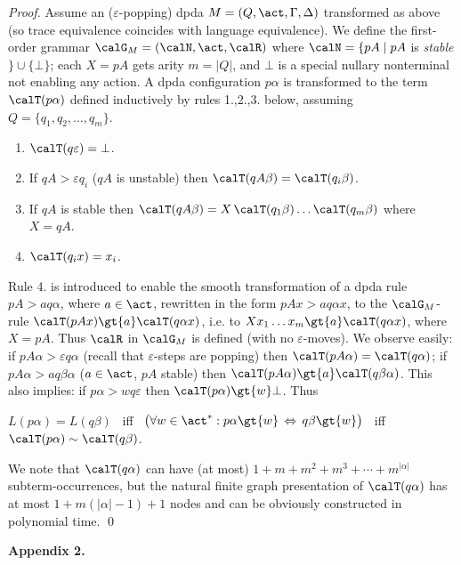 \documentclass[12pt]{article}
\begin{document}
\begin{proof}
Assume an ($\varepsilon$-popping) dpda $M=(Q,\act,\Gamma,\Delta)$
transformed as above
(so trace equivalence coincides with language equivalence).
We define  the first-order grammar $\calG_M=(\calN,\act,\calR)$ where 
$\calN=\{pA\mid pA $ is \emph{stable}$\}\cup\{\bot\}$; 
each $X=pA$ gets arity $m=|Q|$, and 
$\bot$ is a special nullary nonterminal not
enabling any action.
A dpda configuration $p \alpha$ 
is transformed to the term 
$\calT(p \alpha)$ defined inductively by rules 1.,2.,3. below,
assuming $Q=\{q_1,q_2,\dots,q_m\}$. 
\begin{enumerate}
\item
$\calT(q\varepsilon)=\bot$. 
\item
If $qA\gt{\varepsilon}q_i$ ($qA$ is unstable)
then $\calT(qA\beta)=\calT(q_i\beta)$.
\item
If $qA$ is stable then 
$\calT(qA\beta)=X\,\calT(q_1\beta) \dots \calT(q_m\beta)$
where $X=qA$.
\item
$\calT(q_ix)=x_i$.
\end{enumerate}
Rule 4. is introduced to enable  the smooth
transformation of a dpda rule  $pA\gt{a}q\alpha$, where $a\in\act$, 
rewritten in the form
 $pAx\gt{a}q\alpha x$,  to 
the $\calG_M$-rule
$\calT(pAx)\gt{a} \calT(q\alpha x)$, i.e. to
$Xx_1\dots x_m\gt{a} \calT(q\alpha x)$, where $X=pA$.
Thus $\calR$ in $\calG_M$ is defined (with no $\varepsilon$-moves).
We observe easily: 
if $p A\alpha \gt{\varepsilon} q \alpha$ 
(recall that $\varepsilon$-steps are popping) then
$\calT(pA\alpha)=\calT(q \alpha)$; 
if $p A\alpha \gt{a} q \beta\alpha$ ($a\in\act$, $pA$ stable)
then
$\calT(pA\alpha)\gt{a}\calT(q \beta\alpha)$.
This also implies: if $p\alpha\gt{w}q\varepsilon$ then 
$\calT(p\alpha)\gt{w}\bot$. Thus 
\begin{center}
$L(p\alpha)=L(q\beta)$ 
\ iff
\ $\big(\forall
w\in\act^*:p\alpha\gt{w}\,\Leftrightarrow\,q\beta\gt{w}\big)$
\ iff
\ $\calT(p\alpha)\sim \calT(q\beta)$. 
\end{center}
We note that $\calT(q\alpha)$ can have (at most)
$1+m+m^2+m^3+\cdots +m^{|\alpha|}$ subterm-occurrences,
but the natural finite graph presentation of $\calT(q\alpha)$
has at most 
 $1+m(|\alpha|-1)+1$ nodes and can be obviously constructed in
 polynomial time.
\qed
\end{proof}




\noindent
\textbf{Appendix 2.}

\vspace{-4mm}
\end{document}
